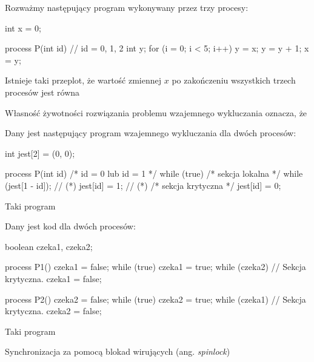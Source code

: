 \begin{problems}
    \prob Rozważmy następujący program wykonywany przez trzy procesy:
    \begin{cpp}
        int x = 0;

        process P(int id) { // id = 0, 1, 2
            int y;
            for (i = 0; i < 5; i++) {
                y = x;
                y = y + 1;
                x = y;
            }
        }
    \end{cpp}

    Istnieje taki przeplot, że wartość zmiennej $x$ po zakończeniu wszystkich trzech procesów jest równa

    \prob Własność żywotności rozwiązania problemu wzajemnego wykluczania oznacza, że

    \prob Dany jest następujący program wzajemnego wykluczania dla dwóch procesów:
    \begin{cpp}
        int jest[2] = (0, 0);
        
        process P(int id) { /* id = 0 lub id = 1 */
            while (true) {
                /* sekcja lokalna */
                while (jest[1 - id]);        // (*)
                jest[id] = 1;                // (*)
                /* sekcja krytyczna */
                jest[id] = 0;
            }
        }
    \end{cpp}
    Taki program
    
    \prob Dany jest kod dla dwóch procesów:
    \begin{java}
        boolean czeka1, czeka2;
        
        process P1() {
            czeka1 = false;
            while (true) {
                czeka1 = true;
                while (czeka2) {}
                // Sekcja krytyczna.
                czeka1 = false;
            }
        }
        
        process P2() {
            czeka2 = false;
            while (true) {
                czeka2 = true;
                while (czeka1) {}
                // Sekcja krytyczna.
                czeka2 = false;
            }
        }
    \end{java}
    Taki program

    \prob Synchronizacja za pomocą blokad wirujących (ang. \textit{spinlock})
\end{problems}

